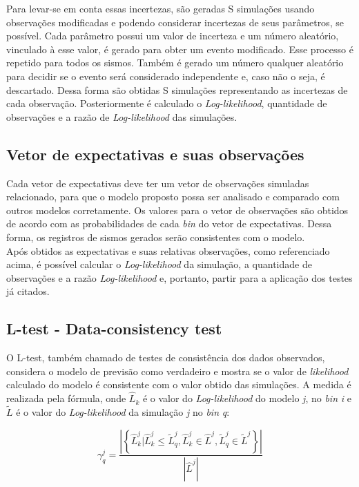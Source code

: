 Para levar-se em conta essas incertezas, são geradas S simulações usando observações modificadas e podendo considerar incertezas de seus parâmetros, se possível. Cada parâmetro possui um valor de incerteza e um número aleatório, vinculado à esse valor, é gerado para obter um evento modificado. Esse processo é repetido para todos os sismos. Também é gerado um número qualquer aleatório para decidir se o evento será considerado independente e, caso não o seja, é descartado. Dessa forma são obtidas S simulações representando as incertezas de cada observação. Posteriormente é calculado o {\it Log-likelihood}, quantidade de observações e a razão de {\it Log-likelihood} das simulações.



\subsection{Vetor de expectativas e suas observações}
Cada vetor de expectativas deve ter um vetor de observações simuladas relacionado, para que o modelo proposto possa ser analisado e comparado com outros modelos corretamente. Os valores para o vetor de observações são obtidos de acordo com as probabilidades de cada {\it bin} do vetor de expectativas. Dessa forma, os registros de sismos gerados serão consistentes com o modelo.\\

Após obtidos as expectativas e suas relativas observações, como referenciado acima, é possível calcular o {\it Log-likelihood} da simulação, a quantidade de observações e a razão {\it Log-likelihood} e, portanto,  partir para a aplicação dos testes já citados.

\subsection{L-test - Data-consistency test}
O L-test, também chamado de testes de consistência dos dados observados, considera o modelo de previsão como verdadeiro e mostra se o valor de {\it likelihood} calculado do modelo é consistente com o valor obtido das simulações. A medida é realizada pela fórmula, onde $\widehat{L}_k$ é o valor do {\it Log-likelihood} do modelo {\it j}, no {\it bin} {\it i} e $\widetilde{L}$ é o valor do {\it Log-likelihood} da simulação {\it j} no {\it bin} {\it q}: 


\begin{equation}
\gamma^{j}_{q} = \frac{\left| \left\{ \widehat{L}^j_k | \widehat{L}^j_k \leq \widetilde{L}^j_q, \widehat{L}^j_k \in \widehat{L}^j, \widetilde{L}^j_q \in \widetilde{L}^j  \right\} \right|}  {|\widehat{L}^j|}
\end{equation}


